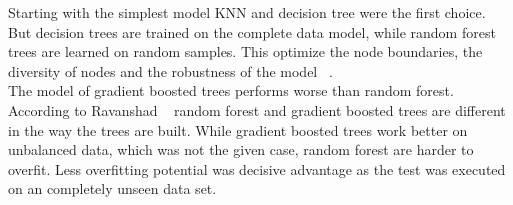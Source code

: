 Starting with the simplest model KNN and decision tree were the first choice. But decision trees are trained on the complete data model, while random forest trees are learned on random samples. This optimize the node boundaries, the diversity of nodes and the robustness of the model  ~\cite{ref_towardsRFvsDecision}.\\
The model of gradient boosted trees performs worse than random forest. According to Ravanshad ~\cite{ref_RFvsGBT} random forest and gradient boosted trees are different in the way the trees are built. While gradient boosted trees work better on unbalanced data, which was not the given case, random forest are harder to overfit. Less overfitting potential was decisive advantage as the test was executed on an completely unseen data set.
